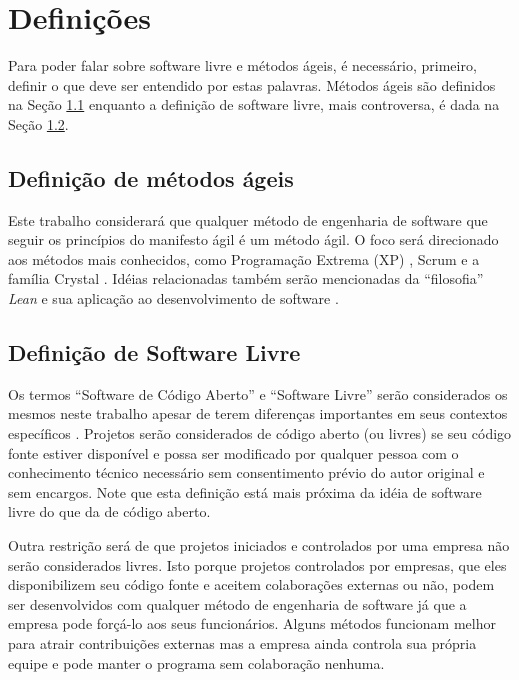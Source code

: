 \chapter{Definições}
\label{cap:definicoes}

Para poder falar sobre software livre e métodos ágeis, é necessário,
primeiro, definir o que deve ser entendido por estas palavras. Métodos
ágeis são definidos na Seção \ref{sec:agile-def} enquanto a definição
de software livre, mais controversa, é dada na Seção \ref{sec:os-def}.

\section{Definição de métodos ágeis}
\label{sec:agile-def}

Este trabalho considerará que qualquer método de engenharia de
software que seguir os princípios do manifesto ágil
\cite{AgileManifesto} é um método ágil. O foco será direcionado aos
métodos mais conhecidos, como Programação Extrema (XP) \cite{XP02},
Scrum \cite{Schwaber2004} e a família Crystal
\cite{Cockburn2002}. Idéias relacionadas também serão mencionadas da
``filosofia'' \emph{Lean} \cite{Ohno1998} e sua aplicação ao
desenvolvimento de software \cite{Poppendieck2005}.

\section{Definição de Software Livre}
\label{sec:os-def}

Os termos ``Software de Código Aberto'' e ``Software Livre'' serão
considerados os mesmos neste trabalho apesar de terem diferenças
importantes em seus contextos específicos \cite[Ch. 1, Free Versus
Open source]{Fogel2005}. Projetos serão considerados de código aberto
(ou livres) se seu código fonte estiver disponível e possa ser
modificado por qualquer pessoa com o conhecimento técnico necessário
sem consentimento prévio do autor original e sem encargos. Note que
esta definição está mais próxima da idéia de software livre do que da
de código aberto.

Outra restrição será de que projetos iniciados e controlados por uma
empresa não serão considerados livres. Isto porque projetos
controlados por empresas, que eles disponibilizem seu código fonte e
aceitem colaborações externas ou não, podem ser desenvolvidos com
qualquer método de engenharia de software já que a empresa pode
forçá-lo aos seus funcionários. Alguns métodos funcionam melhor para
atrair contribuições externas mas a empresa ainda controla sua própria
equipe e pode manter o programa sem colaboração nenhuma.\


